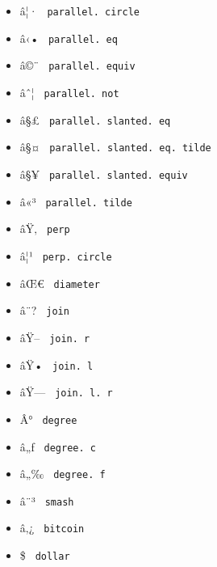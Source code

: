 \begin{itemize}
\item
  \label{symbol-parallel.circle}{{ â¦· }
  \texttt{\ parallel.\ circle\ }}
\item
  \label{symbol-parallel.eq}{{ â‹• }
  \texttt{\ parallel.\ eq\ }}
\item
  \label{symbol-parallel.equiv}{{ â©¨ }
  \texttt{\ parallel.\ equiv\ }}
\item
  \label{symbol-parallel.not}{{ âˆ¦ }
  \texttt{\ parallel.\ not\ }}
\item
  \label{symbol-parallel.slanted.eq}{{ â§£ }
  \texttt{\ parallel.\ slanted.\ eq\ }}
\item
  \label{symbol-parallel.slanted.eq.tilde}{{ â§¤ }
  \texttt{\ parallel.\ slanted.\ eq.\ tilde\ }}
\item
  \label{symbol-parallel.slanted.equiv}{{ â§¥ }
  \texttt{\ parallel.\ slanted.\ equiv\ }}
\item
  \label{symbol-parallel.tilde}{{ â«³ }
  \texttt{\ parallel.\ tilde\ }}
\item
  \label{symbol-perp}{{ âŸ‚ } \texttt{\ perp\ }}
\item
  \label{symbol-perp.circle}{{ â¦¹ }
  \texttt{\ perp.\ circle\ }}
\item
  \label{symbol-diameter}{{ âŒ€ } \texttt{\ diameter\ }}
\item
  \label{symbol-join}{{ â¨? } \texttt{\ join\ }}
\item
  \label{symbol-join.r}{{ âŸ-- } \texttt{\ join.\ r\ }}
\item
  \label{symbol-join.l}{{ âŸ• } \texttt{\ join.\ l\ }}
\item
  \label{symbol-join.l.r}{{ âŸ--- }
  \texttt{\ join.\ l.\ r\ }}
\item
  \label{symbol-degree}{{ Â° } \texttt{\ degree\ }}
\item
  \label{symbol-degree.c}{{ â„ƒ }
  \texttt{\ degree.\ c\ }}
\item
  \label{symbol-degree.f}{{ â„‰ }
  \texttt{\ degree.\ f\ }}
\item
  \label{symbol-smash}{{ â¨³ } \texttt{\ smash\ }}
\item
  \label{symbol-bitcoin}{{ â‚¿ } \texttt{\ bitcoin\ }}
\item
  \label{symbol-dollar}{{ \$ } \texttt{\ dollar\ }}

\end{itemize}
